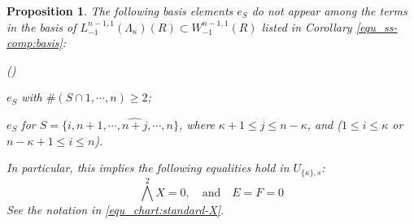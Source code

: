 \documentclass[pdflatex,sn-mathphys-num]{sn-jnl}%
\theoremstyle{thmstyleone}%
\newtheorem{proposition}[subsubsection]{Proposition}%
\theoremstyle{thmstyletwo}%
\numberwithin{equation}{subsection}
\theoremstyle{thmstylethree}%
\newcommand{\wh}{\widehat}
\newenvironment{altenumerate}
	{\begin{list}
			{(\theenumi) }
			{\usecounter{enumi}
				\setlength{\labelwidth}{0pt}
				\setlength{\labelsep}{0pt}
				\setlength{\leftmargin}{0pt}
				\setlength{\itemsep}{\the\smallskipamount}
				\renewcommand{\theenumi}{\roman{enumi}}
		}}
		{\end{list}}
\begin{document}
\begin{proposition}\label{equ_coord_translation:not-show-up}
The following basis elements $e_S$ do not appear among the terms in the basis of $L^{n-1,1}_{-1}(\Lambda_\kappa)(R)\subset W_{-1}^{n-1,1}(R)$ listed in Corollary \ref{equ_ss-comp:basis}:
\begin{altenumerate}
	\item $e_S$ with $\#(S\cap{1,\cdots,n})\geq 2$;
	\item $e_S$ for $S=\{i,n+1,\cdots,\wh{n+j},\cdots,n\}$, where $\kappa+1\leq j\leq n-\kappa$,  and ($1\leq i\leq \kappa$ or $n-\kappa+1\leq i\leq n$). 
\end{altenumerate}
In particular, this implies the following equalities hold in $U_{\{\kappa\},s}$:
\begin{equation*}
\bigwedge^2 X=0,\quad\text{and}\quad E=F=0
\end{equation*}
See the notation in \eqref{equ_chart:standard-X}.
\end{proposition}
\end{document}
